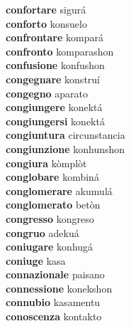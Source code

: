\textbf{confortare } sigurá \\
\textbf{conforto } konsuelo \\
\textbf{confrontare } kompará \\
\textbf{confronto } komparashon \\
\textbf{confusione } konfushon \\
\textbf{congegnare } konstruí \\
\textbf{congegno } aparato \\
\textbf{congiungere } konektá \\
\textbf{congiungersi } konektá \\
\textbf{congiuntura } circunstancia \\
\textbf{congiunzione } konhunshon \\
\textbf{congiura } kòmplòt \\
\textbf{conglobare } kombiná \\
\textbf{conglomerare } akumulá \\
\textbf{conglomerato } betòn \\
\textbf{congresso } kongreso \\
\textbf{congruo } adekuá \\
\textbf{coniugare } konhugá \\
\textbf{coniuge } kasa \\
\textbf{connazionale } paisano \\
\textbf{connessione } konekshon \\
\textbf{connubio } kasamentu \\
\textbf{conoscenza } kontakto \\
